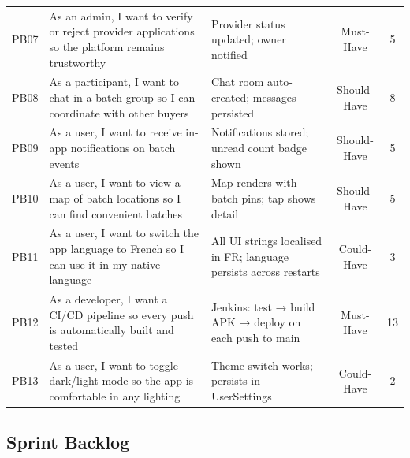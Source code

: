 \documentclass[12pt, a4paper]{report}
\begin{document}
\begin{longtable}{c p{4cm} p{5.5cm} c c}
PB07 & As an admin, I want to verify or reject provider applications so the platform remains trustworthy & Provider status updated; owner notified & Must-Have & 5\\
\rowcolor{batchitLight}
PB08 & As a participant, I want to chat in a batch group so I can coordinate with other buyers & Chat room auto-created; messages persisted & Should-Have & 8\\
PB09 & As a user, I want to receive in-app notifications on batch events & Notifications stored; unread count badge shown & Should-Have & 5\\
\rowcolor{batchitLight}
PB10 & As a user, I want to view a map of batch locations so I can find convenient batches & Map renders with batch pins; tap shows detail & Should-Have & 5\\
PB11 & As a user, I want to switch the app language to French so I can use it in my native language & All UI strings localised in FR; language persists across restarts & Could-Have & 3\\
\rowcolor{batchitLight}
PB12 & As a developer, I want a CI/CD pipeline so every push is automatically built and tested & Jenkins: test → build APK → deploy on each push to main & Must-Have & 13\\
PB13 & As a user, I want to toggle dark/light mode so the app is comfortable in any lighting & Theme switch works; persists in UserSettings & Could-Have & 2\\
\end{longtable}

\subsection{Sprint Backlog}
\end{document}
